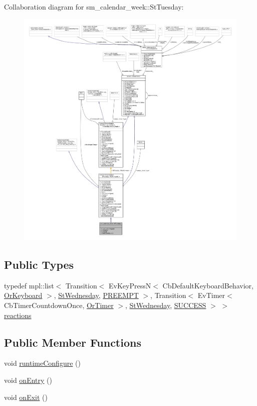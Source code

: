 Collaboration diagram for sm\+\_\+calendar\+\_\+week\+:\+:St\+Tuesday\+:
\nopagebreak
\begin{figure}[H]
\begin{center}
\leavevmode
\includegraphics[width=350pt]{structsm__calendar__week_1_1StTuesday__coll__graph}
\end{center}
\end{figure}
\subsection*{Public Types}
\begin{DoxyCompactItemize}
\item 
typedef mpl\+::list$<$ Transition$<$ Ev\+Key\+PressN$<$ Cb\+Default\+Keyboard\+Behavior, \hyperlink{classsm__calendar__week_1_1OrKeyboard}{Or\+Keyboard} $>$, \hyperlink{structsm__calendar__week_1_1StWednesday}{St\+Wednesday}, \hyperlink{classPREEMPT}{P\+R\+E\+E\+M\+PT} $>$, Transition$<$ Ev\+Timer$<$ Cb\+Timer\+Countdown\+Once, \hyperlink{classsm__calendar__week_1_1OrTimer}{Or\+Timer} $>$, \hyperlink{structsm__calendar__week_1_1StWednesday}{St\+Wednesday}, \hyperlink{classSUCCESS}{S\+U\+C\+C\+E\+SS} $>$ $>$ \hyperlink{structsm__calendar__week_1_1StTuesday_a8761617f08711bc2ba2e3b051c2b5337}{reactions}
\end{DoxyCompactItemize}
\subsection*{Public Member Functions}
\begin{DoxyCompactItemize}
\item 
void \hyperlink{structsm__calendar__week_1_1StTuesday_a1980a60ba5b27efea0cca5746694985f}{runtime\+Configure} ()
\item 
void \hyperlink{structsm__calendar__week_1_1StTuesday_a83f1e21072fe6c023041b08ae536f243}{on\+Entry} ()
\item 
void \hyperlink{structsm__calendar__week_1_1StTuesday_a3f26ab6a7da1faa63294889549968efb}{on\+Exit} ()
\end{DoxyCompactItemize}
